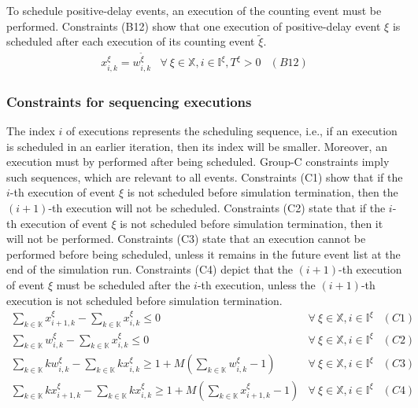 \documentclass[]{interact}
\theoremstyle{plain}%
\theoremstyle{definition}
\theoremstyle{remark}
\begin{document}
To schedule positive-delay events, an execution of the counting event must be performed. Constraints (B12) show that one execution of positive-delay event ${\xi}$ is scheduled after each execution of its counting event ${\tilde{\xi}}$.
\begin{eqnarray}
x^{\xi}_{i,k} = w^{\tilde{\xi}}_{i,k}&  \forall\ \xi\in \mathbb{X},i\in \mathbb{I}^{\xi}, T^{\xi} > 0&(B12)\nonumber
\end{eqnarray}

\subsubsection{Constraints for sequencing executions}\label{sec:const_C2}
The index $i$ of executions represents the scheduling sequence, i.e., if an execution is scheduled in an earlier iteration, then its index will be smaller. Moreover, an execution must by performed after being scheduled. Group-C constraints imply such sequences, which are relevant to all events. Constraints (C1) show that if the $i$-th execution of event $\xi$ is not scheduled before simulation termination, then the $(i+1)$-th execution will not be scheduled. Constraints (C2) state that if the $i$-th execution of event $\xi$ is not scheduled before simulation termination, then it will not be performed. Constraints (C3) state that an execution cannot be performed before being scheduled, unless it remains in the future event list at the end of the simulation run. Constraints (C4) depict that the $(i+1)$-th execution of event $\xi$ must be scheduled after the $i$-th execution, unless the $(i+1)$-th execution is not scheduled before simulation termination.
\begin{eqnarray}
\sum_{k\in \mathbb{K}} x^{\xi}_{i+1,k} - \sum_{k\in \mathbb{K}} x^{\xi}_{i,k} \le 0&  \forall\ \xi\in \mathbb{X},i\in \mathbb{I}^{\xi}&(C1)\nonumber\\
\sum_{k\in \mathbb{K}} w^{\xi}_{i,k}-\sum_{k\in \mathbb{K}} x^{\xi}_{i,k} \le 0&  \forall\ \xi\in \mathbb{X},i\in \mathbb{I}^{\xi}&(C2)\nonumber\\
\sum_{k\in \mathbb{K}} kw^{\xi}_{i,k} - \sum_{k\in \mathbb{K}} kx^{\xi}_{i,k} \ge 1 +M(\sum_{k\in \mathbb{K}} w^{\xi}_{i,k}-1) &\forall\ \xi\in \mathbb{X}, i\in \mathbb{I}^{\xi}&(C3) \nonumber\\
\sum_{k\in \mathbb{K}} kx^{\xi}_{i+1,k} - \sum_{k\in \mathbb{K}} kx^{\xi}_{i,k} \ge 1+M(\sum_{k\in \mathbb{K}} x^{\xi}_{i+1,k}-1)&  \forall\ \xi\in \mathbb{X},i\in \mathbb{I}^{\xi}&(C4)\nonumber
\end{eqnarray}
\end{document}
